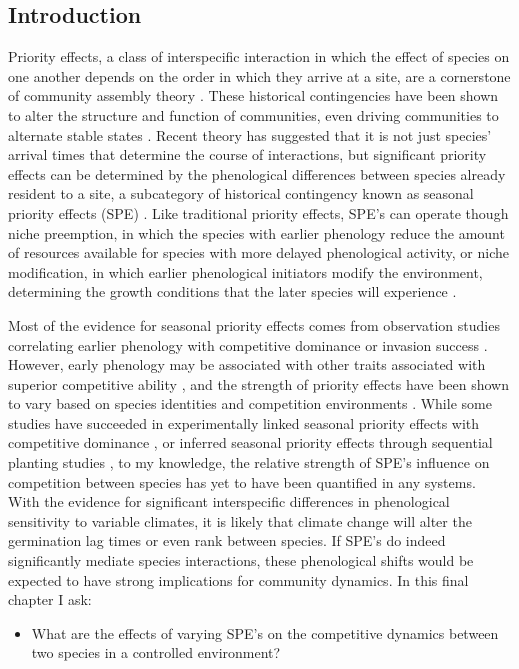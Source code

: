 \documentclass[12pt]{article}\usepackage[]{graphicx}\usepackage[]{color}
\begin{document}
\subsection*{Introduction}
\indent\indent Priority effects, a class of interspecific interaction in which the effect of species on one another depends on the order in which they arrive at a site, are a cornerstone of community assembly theory \citep{Fukami2015}. These historical contingencies have been shown to alter the structure and function of communities, even driving communities to alternate stable states \citep{Fukami2011}. Recent theory has suggested that it is not just species' arrival times that determine the course of interactions, but significant priority effects can be determined by the phenological differences between species already resident to a site, a subcategory of historical contingency known as seasonal priority effects (SPE) \citep{Wainwright2012}. Like traditional priority effects, SPE's can operate though niche preemption, in which the species with earlier phenology reduce the amount of resources available for species with more delayed phenological activity, or niche modification, in which earlier phenological initiators modify the environment, determining the growth conditions that the later species will experience \citep{Fukami2015}.
\par Most of the evidence for seasonal priority effects comes from observation studies correlating earlier phenology with competitive dominance or invasion success \citep{Gioria2018}. However, early phenology may be associated with other traits associated with superior competitive ability \citep{Dickson2012}, and the strength of priority effects have been shown to vary based on species identities \citep{Cleland2015} and competition environments \citep{Kardol2013}. While some studies have succeeded in experimentally linked seasonal priority effects with competitive dominance \citep{Wainwright2012}, or inferred seasonal priority effects through sequential planting studies \citep{Korner2008}, to my knowledge, the relative strength of SPE's influence on competition between species has yet to have been quantified in any systems.\\
\indent With the evidence for significant interspecific differences in phenological sensitivity to variable climates, it is likely that climate change will alter the germination lag times or even rank between species. If SPE's do indeed significantly mediate species interactions, these phenological shifts would be expected to have strong implications for community dynamics. In this final chapter I ask:
\begin{itemize}
\item What are the effects of varying SPE's on the competitive dynamics between two species in a controlled environment?
\end{itemize}
\end{document}
